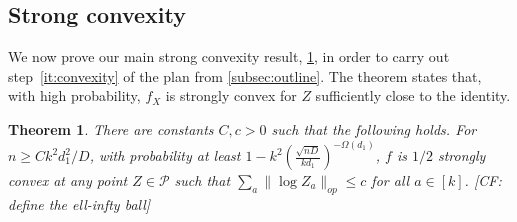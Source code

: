 \documentclass{article}
\newtheorem{theorem}{Theorem}
\newcommand\PD{\operatorname{P}}
\newcommand\SPD{\mathcal{P}}
\newcommand\samp{x}
\newcommand\rv{X}
\newcommand{\CF}[1]{{\color{purple}[CF: #1]}}
\begin{document}







\subsection{Strong convexity}




We now prove our main strong convexity result, \cref{thm:ball-convexity}, in order to carry out step~\ref{it:convexity} of the plan from \cref{subsec:outline}. The theorem states that, with high probability, $f_X$ is strongly convex for $Z$ sufficiently close to the identity.



\begin{theorem}\label{thm:ball-convexity} There are constants $C,c>0$ such that the following holds. For $n \geq C k^2 d_1^2/D$, with probability at least $1 - k^2 \left(\frac {\sqrt{nD}}{kd_1}\right)^{ - \Omega(d_1)}$, $f$ is $1/2$ strongly convex at any point $Z \in \SPD$ such that $\sum_a \|\log Z_a\|_{op} \leq c$ for all $a \in [k]$. \CF{define the ell-infty ball}
\end{theorem}
\end{document}
